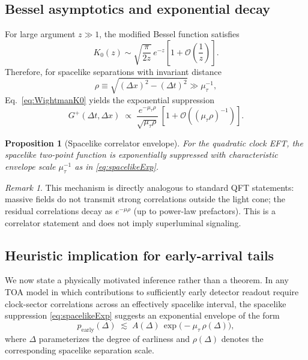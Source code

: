 \documentclass[11pt, a4paper]{article}
\theoremstyle{definition}
\theoremstyle{plain}
\newtheorem{proposition}{Proposition}[section]
\theoremstyle{remark}
\newtheorem{remark}{Remark}[section]
\numberwithin{equation}{section}
\newcommand{\cO}{\mathcal{O}}
\newcommand{\Gplus}{G^{+}}
\newcommand{\Kzero}{K_{0}}
\begin{document}
    \subsection{Bessel asymptotics and exponential decay}
        
        For large argument $z\gg 1$, the modified Bessel function satisfies
        \begin{equation}
            \Kzero(z)\sim \sqrt{\frac{\pi}{2z}}\,e^{-z}\left[1+\cO\!\left(\frac{1}{z}\right)\right].
            \label{eq:K0asym}
        \end{equation}
        Therefore, for spacelike separations with invariant distance
        \begin{equation}
            \rho \equiv \sqrt{(\Delta x)^2-(\Delta t)^2}\gg \mu_\tau^{-1},
        \end{equation}
        Eq.~\eqref{eq:WightmanK0} yields the exponential suppression
        \begin{equation}
            \Gplus(\Delta t,\Delta x)\;\propto\;
            \frac{e^{-\mu_\tau \rho}}{\sqrt{\mu_\tau \rho}}\,
            \left[1+\cO\!\left((\mu_\tau\rho)^{-1}\right)\right].
            \label{eq:spacelikeExp}
        \end{equation}
        
        \begin{proposition}[Spacelike correlator envelope]
For the quadratic clock EFT, the spacelike two-point function is exponentially suppressed with characteristic envelope scale $\mu_\tau^{-1}$ as in \eqref{eq:spacelikeExp}.
        \end{proposition}
        
        \begin{remark}
            This mechanism is directly analogous to standard QFT statements: massive fields do not transmit strong correlations outside the light cone; the residual correlations decay as $e^{-\mu \rho}$ (up to power-law prefactors). This is a correlator statement and does not imply superluminal signaling.
        \end{remark}
    
    \subsection{Heuristic implication for early-arrival tails}
        
        We now state a physically motivated inference rather than a theorem. In any TOA model in which contributions to sufficiently early detector readout require clock-sector correlations across an effectively spacelike interval, the spacelike suppression \eqref{eq:spacelikeExp} suggests an exponential envelope of the form
        \begin{equation}
            p_{\mathrm{early}}(\Delta)\;\lesssim\;A(\Delta)\,\exp\!\big(-\mu_\tau\,\rho(\Delta)\big),
            \label{eq:earlyBound}
        \end{equation}
        where $\Delta$ parameterizes the degree of earliness and $\rho(\Delta)$ denotes the corresponding spacelike separation scale.
        
\end{document}

